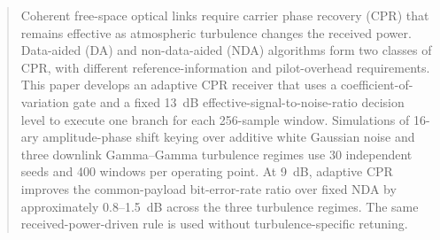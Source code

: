 \begin{abstract}
Coherent free-space optical links require carrier phase recovery (CPR) that remains effective as atmospheric turbulence changes the received power. Data-aided (DA) and non-data-aided (NDA) algorithms form two classes of CPR, with different reference-information and pilot-overhead requirements. This paper develops an adaptive CPR receiver that uses a coefficient-of-variation gate and a fixed 13~dB effective-signal-to-noise-ratio decision level to execute one branch for each 256-sample window. Simulations of 16-ary amplitude-phase shift keying over additive white Gaussian noise and three downlink Gamma--Gamma turbulence regimes use 30 independent seeds and 400 windows per operating point. At 9~dB, adaptive CPR improves the common-payload bit-error-rate ratio over fixed NDA by approximately 0.8--1.5~dB across the three turbulence regimes. The same received-power-driven rule is used without turbulence-specific retuning.
\end{abstract}
